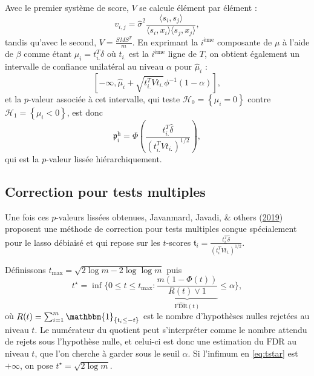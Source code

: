 \documentclass[12pt,a4paper]{reedthesis}
\newcommand \indic {\mathbbm{1}}
\newcommand \pv {\mathfrak{p}}
\newcommand \ts {\mathfrak{t}}
\newcommand \shifts {\delta}
\newcommand \optim {\beta}
\theoremstyle{definition}
\theoremstyle{definition}
\theoremstyle{definition}
\theoremstyle{remark}
\begin{document}
Avec le premier système de score, \(V\) se calcule élément par élément :
\begin{equation*}
v_{i,j} = \hat{\sigma}^2 \frac{\langle s_i,s_j\rangle}{\langle s_i,x_i\rangle\langle s_j,x_j\rangle},
\end{equation*}
tandis qu'avec le second, \(V = \frac{S M S^T }{m}\). En exprimant la \(i^{\text{ème}}\) composante de \(\mu\) à l'aide de \(\optim\) comme étant \(\mu_i = t_{i.}^T\shifts\) où \(t_{i.}\) est la \(i^{\text{ème}}\) ligne de \(T\), on obtient également un intervalle de confiance unilatéral au niveau \(\alpha\) pour \(\hat{\mu}_i\) :
\begin{equation*}
\left[-\infty, \hat{\mu}_i + \sqrt{t_{i.}^T V t_{i.}} \phi^{-1}\left(1-\alpha\right)\right],
\end{equation*}
et la \(p\)-valeur associée à cet intervalle, qui teste \(\mathcal{H}_0 = \left\{\mu_i = 0\right\}\) contre \(\mathcal{H}_1 = \left\{\mu_i < 0\right\}\), est donc
\begin{equation*}
\pv^\text{h}_i = \Phi\left(\frac{t_{i.}^T\hat{\shifts}}{\left(t_{i.}^TVt_{i.}\right)^{1/2}}\right),
\end{equation*}
qui est la \(p\)-valeur lissée hiérarchiquement.

\hypertarget{correction-pour-tests-multiples}{%
\subsection{Correction pour tests multiples}\label{correction-pour-tests-multiples}}

Une fois ces \(p\)-valeurs lissées obtenues, Javanmard, Javadi, \& others (\protect\hyperlink{ref-javanmard2019false}{2019}) proposent une méthode de correction pour tests multiples conçue spécialement pour le lasso débiaisé et qui repose sur les \(t\)-scores
\(\ts_i = \frac{t_{i.}^T\hat{\shifts}}{\left(t_{i.}^TVt_{i.}\right)^{1/2}}\).

Définissons \(t_{\text{max}} = \sqrt{2 \log m - 2 \log \log m}\) puis
\begin{equation}
\label{eq:tstar}
t^{\star} = \inf \bigg\{ 0 \leq t \leq t_{\max} : \underbrace{\frac{m(1 - \Phi(t))}{R(t) \vee 1}}_{\widehat{\text{FDR}}(t)} \leq \alpha \bigg\},
\end{equation}
où \(R(t)= \sum_{i = 1}^m \indic_{\{\ts_i \leq -t\}}\) est le nombre d'hypothèses nulles rejetées au niveau \(t\). Le numérateur du quotient peut s'interpréter comme le nombre attendu de rejets sous l'hypothèse nulle, et celui-ci est donc une estimation du \(\text{FDR}\) au niveau \(t\), que l'on cherche à garder sous le seuil \(\alpha\). Si l'infimum en \eqref{eq:tstar} est \(+\infty\), on pose \(t^{\star} = \sqrt{2 \log m}\).
\end{document}
